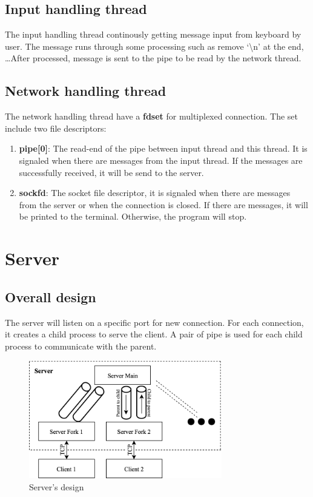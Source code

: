\documentclass[12pt]{article}
\begin{document}
\subsection{Input handling thread}

The input handling thread continously getting message input from keyboard by user. The message runs through some processing such as remove `\textbackslash n' at the end, \dots After processed, message is sent to the pipe to be read by the network thread.

\subsection{Network handling thread}

The network handling thread have a \textbf{fdset} for multiplexed connection. The set include two file descriptors:

\begin{enumerate}
\item \textbf{pipe[0]}: The read-end of the pipe between input thread and this thread. It is signaled when there are messages from the input thread. If the messages are successfully received, it will be send to the server.
\item \textbf{sockfd}: The socket file descriptor, it is signaled when there are messages from the server or when the connection is closed. If there are messages, it will be printed to the terminal. Otherwise, the program will stop.
\end{enumerate}

\section{Server}

\subsection{Overall design}

The server will listen on a specific port for new connection. For each connection, it creates a child process to serve the client. A pair of pipe is used for each child process to communicate with the parent.

\begin{figure}[H]
\centering
\includegraphics[width=0.75\textwidth]{server_diagram.png}
\caption{Server's design}
\end{figure}
\end{document}
